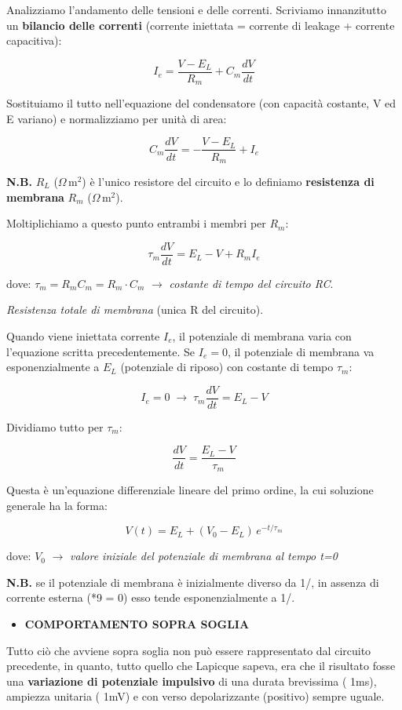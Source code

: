 Analizziamo l'andamento delle tensioni e delle correnti.
Scriviamo innanzitutto un \textbf{bilancio delle correnti} (corrente iniettata = corrente di leakage + corrente capacitiva):

\[
I_e = \frac{V - E_L}{R_m} + C_m \frac{dV}{dt}
\]

Sostituiamo il tutto nell'equazione del condensatore (con capacità costante, V ed E variano) e normalizziamo per unità di area:

\[
C_m \frac{dV}{dt} = -\frac{V - E_L}{R_m} + I_e
\]

\textbf{N.B.} $R_L$ ($\Omega\,\text{m}^2$) è l'unico resistore del circuito e lo definiamo \textbf{resistenza di membrana} $R_m$ ($\Omega\,\text{m}^2$).

Moltiplichiamo a questo punto entrambi i membri per $R_m$:

\[
\tau_m \frac{dV}{dt} = E_L - V + R_m I_e
\]

dove: $\tau_m = R_m C_m = R_m \cdot C_m$ $\rightarrow$ \textit{costante di tempo del circuito RC}.

\textit{Resistenza totale di membrana} (unica R del circuito).

Quando viene iniettata corrente $I_e$, il potenziale di membrana varia con l'equazione scritta precedentemente. Se $I_e = 0$, il potenziale di membrana va esponenzialmente a $E_L$ (potenziale di riposo) con costante di tempo $\tau_m$:

\[
I_e = 0 \;\rightarrow\; \tau_m \frac{dV}{dt} = E_L - V
\]

Dividiamo tutto per $\tau_m$:

\[
\frac{dV}{dt} = \frac{E_L - V}{\tau_m}
\]

Questa è un'equazione differenziale lineare del primo ordine, la cui soluzione generale ha la forma:

\[
V(t) = E_L + (V_0 - E_L)\,e^{-t/\tau_m}
\]

dove: $V_0$ $\rightarrow$ \textit{valore iniziale del potenziale di membrana al tempo t=0}

\textbf{N.B. }se il potenziale di membrana è inizialmente diverso da 1/, in assenza di corrente esterna (*9 = 0) esso tende esponenzialmente a 1/.

\begin{itemize}
  \item \textbf{COMPORTAMENTO SOPRA SOGLIA}
\end{itemize}
Tutto ciò che avviene sopra soglia non può essere rappresentato dal circuito precedente, in quanto, tutto quello che Lapicque sapeva, era che il risultato fosse una \textbf{variazione di potenziale impulsivo }di una durata brevissima ( 1ms), ampiezza unitaria ( 1mV) e con verso depolarizzante (positivo) sempre uguale.

